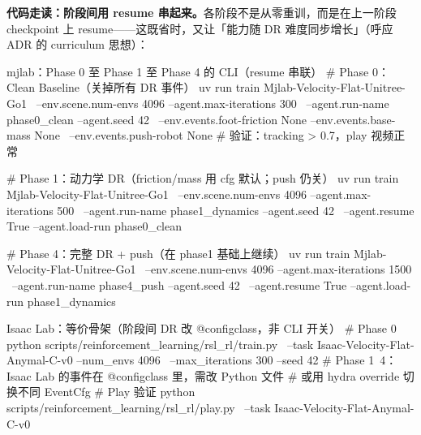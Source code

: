 \textbf{代码走读：阶段间用 resume 串起来。}各阶段不是从零重训，而是在上一阶段 checkpoint 上 resume——这既省时，又让「能力随 DR 难度同步增长」（呼应 ADR 的 curriculum 思想）：

\begin{codebox}[bash]{mjlab：Phase 0 至 Phase 1 至 Phase 4 的 CLI（resume 串联）}
# Phase 0：Clean Baseline（关掉所有 DR 事件）
uv run train Mjlab-Velocity-Flat-Unitree-Go1 \
  --env.scene.num-envs 4096 --agent.max-iterations 300 \
  --agent.run-name phase0_clean --agent.seed 42 \
  --env.events.foot-friction None --env.events.base-mass None \
  --env.events.push-robot None
# 验证：tracking > 0.7，play 视频正常

# Phase 1：动力学 DR（friction/mass 用 cfg 默认；push 仍关）
uv run train Mjlab-Velocity-Flat-Unitree-Go1 \
  --env.scene.num-envs 4096 --agent.max-iterations 500 \
  --agent.run-name phase1_dynamics --agent.seed 42 \
  --agent.resume True --agent.load-run phase0_clean

# Phase 4：完整 DR + push（在 phase1 基础上继续）
uv run train Mjlab-Velocity-Flat-Unitree-Go1 \
  --env.scene.num-envs 4096 --agent.max-iterations 1500 \
  --agent.run-name phase4_push --agent.seed 42 \
  --agent.resume True --agent.load-run phase1_dynamics
\end{codebox}

\begin{codebox}[bash]{Isaac Lab：等价骨架（阶段间 DR 改 @configclass，非 CLI 开关）}
# Phase 0
python scripts/reinforcement_learning/rsl_rl/train.py \
  --task Isaac-Velocity-Flat-Anymal-C-v0 --num_envs 4096 \
  --max_iterations 300 --seed 42
# Phase 1~4：Isaac Lab 的事件在 @configclass 里，需改 Python 文件
#            或用 hydra override 切换不同 EventCfg
# Play 验证
python scripts/reinforcement_learning/rsl_rl/play.py \
  --task Isaac-Velocity-Flat-Anymal-C-v0
\end{codebox}

